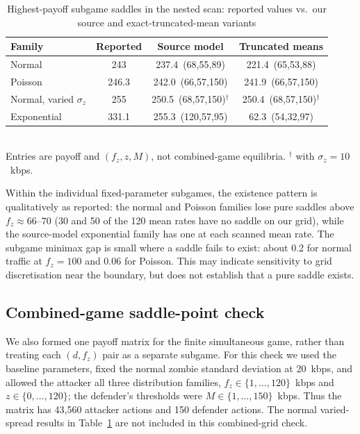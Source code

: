 \documentclass[conference]{IEEEtran}
\begin{document}
\begin{table}[t]
\caption{Highest-payoff subgame saddles in the nested scan: reported values vs.\ our source and exact-truncated-mean variants}
\label{tab:general}
\centering\scriptsize\setlength{\tabcolsep}{3pt}
\begin{tabular}{lccc}
\toprule
Family & Reported & Source model & Truncated means\\
\midrule
Normal & 243 & 237.4 \,(68,55,89) & 221.4 \,(65,53,88)\\
Poisson & 246.3 & 242.0 \,(66,57,150) & 241.9 \,(66,57,150)\\
Normal, varied $\sigma_z$ & 255 & 250.5 \,(68,57,150)$^\dagger$ & 250.4 \,(68,57,150)$^\dagger$\\
Exponential & 331.1 & 255.3 \,(120,57,95) & 62.3 \,(54,32,97)\\
\bottomrule
\end{tabular}\\[2pt]
{\scriptsize Entries are payoff and $(f_z,z,M)$, not combined-game equilibria. $^\dagger$ with $\sigma_z{=}10$~kbps.}
\end{table}

Within the individual fixed-parameter subgames, the existence pattern is qualitatively as reported: the normal and Poisson families lose pure saddles above $f_z\approx66$--$70$ (30 and 50 of the 120 mean rates have no saddle on our grid), while the source-model exponential family has one at each scanned mean rate. The subgame minimax gap is small where a saddle fails to exist: about 0.2 for normal traffic at $f_z{=}100$ and 0.06 for Poisson. This may indicate sensitivity to grid discretisation near the boundary, but does not establish that a pure saddle exists.

\subsection{Combined-game saddle-point check}
We also formed one payoff matrix for the finite simultaneous game, rather than treating each $(d,f_z)$ pair as a separate subgame. For this check we used the baseline parameters, fixed the normal zombie standard deviation at 20~kbps, and allowed the attacker all three distribution families, $f_z\in\{1,\ldots,120\}$~kbps and $z\in\{0,\ldots,120\}$; the defender's thresholds were $M\in\{1,\ldots,150\}$~kbps. Thus the matrix has 43,560 attacker actions and 150 defender actions. The normal varied-spread results in Table~\ref{tab:general} are not included in this combined-grid check.
\end{document}
